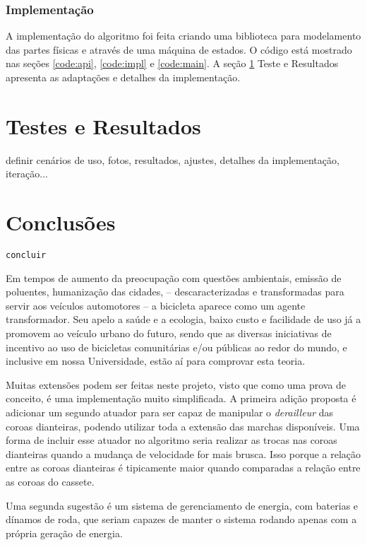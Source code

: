\documentclass[a4paper,11pt]{article}
\begin{document}
\subsubsection{Implementação}
\label{sec:implemt}

A implementação do algoritmo foi feita criando uma biblioteca para
modelamento das partes físicas e através de uma máquina de  estados. O código
está mostrado nas seções \ref{code:api}, \ref{code:impl} e \ref{code:main}. A
seção \ref{sec:resultados} Teste e Resultados apresenta as adaptações e
detalhes da implementação.


\pagebreak
%
\section{Testes e Resultados}
\label{sec:resultados}
definir cenários de uso, fotos, resultados, ajustes,
detalhes da implementação, iteração...

\pagebreak
%
\section{Conclusões}
\label{sec:conclusoes}
\texttt{concluir}

Em tempos de aumento da preocupação com questões ambientais, emissão de
poluentes, humanização das cidades, -- descaracterizadas e transformadas para
servir aos veículos automotores -- a bicicleta aparece como um agente
transformador. Seu apelo a saúde e a ecologia, baixo custo e facilidade de uso
já a promovem ao veículo urbano do futuro, sendo que as diversas iniciativas de
incentivo ao uso de bicicletas comunitárias e/ou públicas ao redor do mundo, e
inclusive em nossa Universidade, estão aí para comprovar esta teoria. 

Muitas extensões podem ser feitas neste projeto, visto que como uma prova de
conceito, é uma implementação muito simplificada. A primeira adição proposta
é adicionar um segundo atuador para ser capaz de manipular o
\textit{derailleur} das coroas dianteiras, podendo utilizar toda a extensão das
marchas disponíveis. Uma forma de incluir esse atuador no algoritmo seria
realizar as trocas nas coroas dianteiras quando a mudança de velocidade for
mais brusca. Isso porque a relação entre as coroas dianteiras é tipicamente
maior quando comparadas a relação entre as coroas do cassete.

Uma segunda sugestão é um sistema de gerenciamento de energia, com baterias e
dínamos de roda, que seriam capazes de manter o sistema rodando apenas com a
própria geração de energia.
\end{document}
